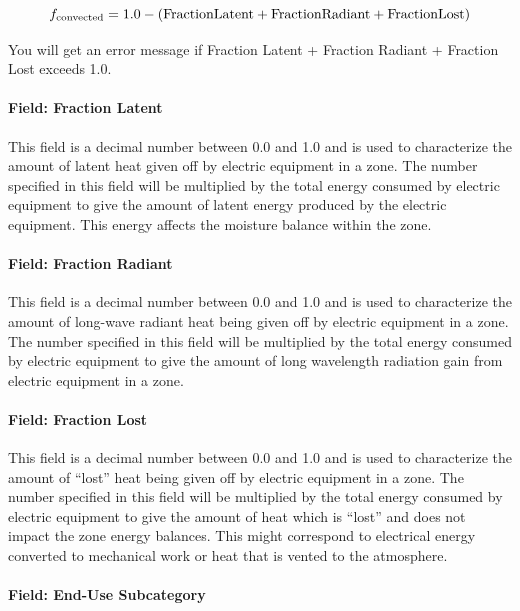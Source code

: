 \begin{equation}
  f_{\rm{convected}} = 1.0 - (\rm{Fraction Latent} + \rm{Fraction Radiant} + \rm{Fraction Lost})
\end{equation}

You will get an error message if Fraction Latent + Fraction Radiant + Fraction Lost exceeds 1.0.

\paragraph{Field: Fraction Latent}\label{field-fraction-latent}

This field is a decimal number between 0.0 and 1.0 and is used to characterize the amount of latent heat given off by electric equipment in a zone. The number specified in this field will be multiplied by the total energy consumed by electric equipment to give the amount of latent energy produced by the electric equipment. This energy affects the moisture balance within the zone.

\paragraph{Field: Fraction Radiant}\label{field-fraction-radiant-2}

This field is a decimal number between 0.0 and 1.0 and is used to characterize the amount of long-wave radiant heat being given off by electric equipment in a zone. The number specified in this field will be multiplied by the total energy consumed by electric equipment to give the amount of long wavelength radiation gain from electric equipment in a zone.

\paragraph{Field: Fraction Lost}\label{field-fraction-lost}

This field is a decimal number between 0.0 and 1.0 and is used to characterize the amount of ``lost'' heat being given off by electric equipment in a zone. The number specified in this field will be multiplied by the total energy consumed by electric equipment to give the amount of heat which is ``lost'' and does not impact the zone energy balances. This might correspond to electrical energy converted to mechanical work or heat that is vented to the atmosphere.

\paragraph{Field: End-Use Subcategory}\label{field-end-use-subcategory-1-001}

